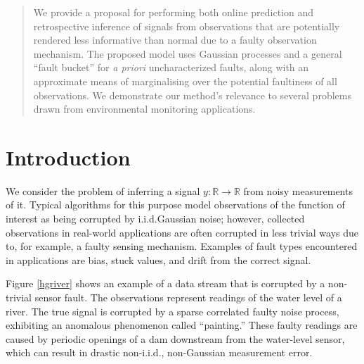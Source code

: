 \documentclass{article}
\newcommand{\psff}[1]{\texttt{[image: \#1.eps]}}
\newcommand{\R}{\ensuremath{\mathbb{R}}}
\begin{document}

\begin{abstract}
We provide a proposal for performing both online prediction and
retrospective inference of signals from observations that are
potentially rendered less informative than normal due to a faulty
observation mechanism.  The proposed model uses Gaussian processes
and a general ``fault bucket'' for \textit{a priori} uncharacterized
faults, along with an approximate means of marginalising over the potential 
faultiness of all observations. We demonstrate our method's relevance to several problems drawn from environmental monitoring applications.
\end{abstract}

\section{Introduction}
We consider the problem of inferring a signal $y\colon \R \to \R$ from
noisy measurements of it.  Typical algorithms for this purpose model
observations of the function of interest as being corrupted by
i.i.d.\space Gaussian noise; however, collected observations in
real-world applications are often corrupted in less trivial ways due
to, for example, a faulty sensing mechanism.  Examples of fault types
encountered in applications are bias, stuck values, and drift from the
correct signal.

Figure \ref{hgriver} shows an example of a data stream that is
corrupted by a non-trivial sensor fault.  The observations represent
readings of the water level of a river.  The true signal is corrupted
by a sparse correlated faulty noise process, exhibiting an anomalous
phenomenon called ``painting.''  These faulty readings are caused by
periodic openings of a dam downstream from the water-level sensor,
which can result in drastic non-i.i.d., non-Gaussian measurement
error.

\end{document}
